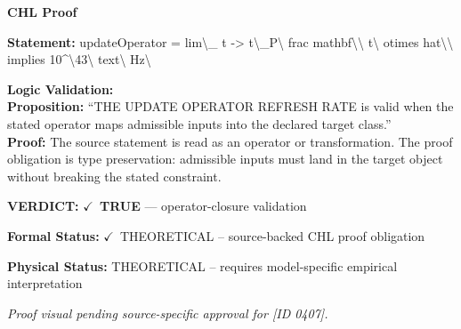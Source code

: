 \vspace{0.45em}
\noindent\textbf{CHL Proof}\par
\textbf{Statement:} updateOperator = lim\textbackslash{}\_ t -> t\textbackslash{}\_P\textbackslash{} frac mathbf\textbackslash{}\textbackslash{} t\textbackslash{} otimes hat\textbackslash{}\textbackslash{} implies 10\textasciicircum{}\textbackslash{}43\textbackslash{} text\textbackslash{}
Hz\textbackslash{}

\textbf{Logic Validation:}\\
\textbf{Proposition:} ``THE UPDATE OPERATOR REFRESH RATE is valid when the stated operator maps admissible
inputs into the declared target class.''\\
\textbf{Proof:} The source statement is read as an operator or transformation. The proof obligation is
type preservation: admissible inputs must land in the target object without breaking the
stated constraint.

\textbf{VERDICT:} \ensuremath{\checkmark}\ \textbf{TRUE} --- operator-closure validation

\textbf{Formal Status:} \ensuremath{\checkmark}\ THEORETICAL -- source-backed CHL proof obligation

\textbf{Physical Status:} THEORETICAL -- requires model-specific empirical interpretation
\par\vspace{0.45em}
\par
\vfill
\begingroup\footnotesize\itshape
Proof visual pending source-specific approval for [ID 0407].
\par\endgroup
\vfill
\endgroup
\endgroup
